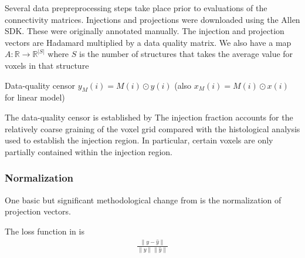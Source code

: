 \label{sec:dp}

Several data prepreprocessing steps take place prior to evaluations of the connectivity matrices.
Injections and projections were downloaded using the Allen SDK.
These were originally annotated manually.
The injection and projection vectors are Hadamard multiplied by a data quality matrix. We also have a map $A: \mathbb R \to \mathbb R^{|S|}$ where $S$ is the number of structures that takes the average value for voxels in that structure

\begin{algorithmic}
\State Data-quality censor $y_M (i) = M(i) \odot y(i)$ (also $x_M(i) = M(i) \odot x(i)$ for linear model)
\end{algorithmic}

The data-quality censor is established by 
The injection fraction accounts for the relatively coarse graining of the voxel grid compared with the histological analysis used to establish the injection region.  In particular, certain voxels are only partially contained within the injection region.

\subsubsection{Normalization}

One basic but significant methodological change from \citet{Knox2019-ot} is the normalization of projection vectors.

\begin{comment}
\begin{figure}
    \centering
    \texttt{[image: ]}
    \caption{Caption}
    \label{fig:my_label}
\end{figure}
\end{comment}
The loss function in \citet{Knox2019-ot} is
\begin{eqnarray*}
\frac{\|y - \hat y\|} {\|y\|\|\hat y\|}
\end{eqnarray*}

